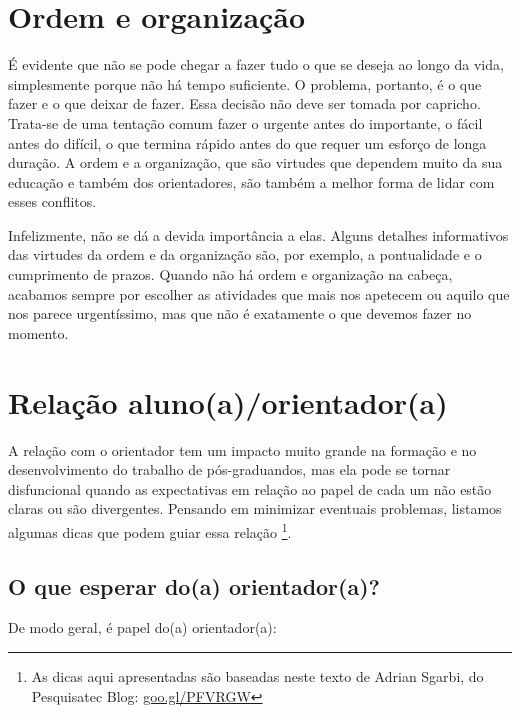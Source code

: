 \documentclass[twoside a4paper 12pt]{report}
\begin{document}
\section{Ordem e organização}

É evidente que não se pode chegar a fazer tudo o que se deseja ao longo da vida, simplesmente porque não há tempo suficiente. O problema, portanto, é o que fazer e o que deixar de fazer. Essa decisão não deve ser tomada por capricho. Trata-se de uma tentação comum fazer o urgente antes do importante, o fácil antes do difícil, o que termina rápido antes do que requer um esforço de longa duração. A ordem e a organização, que são virtudes que dependem muito da sua educação e também dos orientadores, são também a melhor forma de lidar com esses conflitos.

Infelizmente, não se dá a devida importância a elas. Alguns detalhes informativos das virtudes da ordem e da organização são, por exemplo, a pontualidade e o cumprimento de prazos. Quando não há ordem e organização na cabeça, acabamos sempre por escolher as atividades que mais nos apetecem ou aquilo que nos parece urgentíssimo, mas que não é exatamente o que devemos fazer no momento.

\section{Relação aluno(a)/orientador(a)}

A relação com o orientador tem um impacto muito grande na formação e no desenvolvimento do trabalho de pós-graduandos, mas ela pode se tornar disfuncional quando as expectativas em relação ao papel de cada um não estão claras ou são divergentes. Pensando em minimizar eventuais problemas, listamos algumas dicas que podem guiar essa relação \footnote{As dicas aqui apresentadas são baseadas neste texto de Adrian Sgarbi, do Pesquisatec Blog: {\url{goo.gl/PFVRGW}}}. 

\subsection{O que esperar do(a) orientador(a)?}

	De modo geral, é papel do(a) orientador(a):
	
\end{document}
